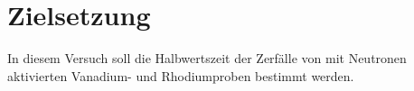 \section{Zielsetzung}
\label{sec:Zielsetzung}

In diesem Versuch soll die Halbwertszeit der Zerfälle von mit Neutronen aktivierten Vanadium- und Rhodiumproben bestimmt werden.
